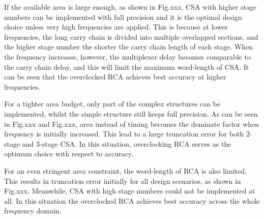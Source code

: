 \documentclass[journal]{IEEEtran}
\begin{document}

If the available area is large enough, as shown in Fig.xxx, CSA with higher stage numbers can be implemented with full precision and it is the optimal design choice unless very high frequencies are applied. This is because at lower frequencies, the long carry chain is divided into multiple overlapped sections, and the higher stage number the shorter the carry chain length of each stage. When the frequency increases, however, the multiplexer delay becomes comparable to the carry chain delay, and this will limit the maximum word-length of CSA. It can be seen that the overclocked RCA achieves best accuracy at higher frequencies.

For a tighter area budget, only part of the complex structures can be implemented, whilst the simple structure still keeps full precision. As can be seen in Fig.xxx and Fig.xxx, area instead of timing becomes the dominate factor when frequency is initially increased. This lead to a large truncation error for both 2-stage and 3-stage CSA. In this situation, overclocking RCA serves as the optimum choice with respect to accuracy.

For an even stringent area constraint, the word-length of RCA is also limited. This results in truncation error initially for all design scenarios, as shown in Fig.xxx. Meanwhile, CSA with high stage numbers could not be implemented at all. In this situation the overclocked RCA achieves best accuracy across the whole frequency domain.
\end{document}

